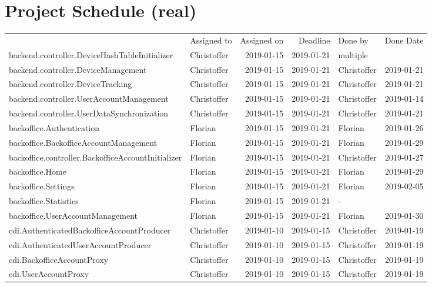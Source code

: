 \chapter{Project Schedule (real)}
\begin{adjustbox}{totalheight=\baselineskip}
\begin{tabular}{ l l r r l r }
 & Assigned to & Assigned on & Deadline & Done by & Done Date \\
backend.controller.DeviceHashTableInitializer & Christoffer & 2019-01-15 & 2019-01-21 & multiple &  \\
backend.controller.DeviceManagement & Christoffer & 2019-01-15 & 2019-01-21 & Christoffer & 2019-01-21 \\
backend.controller.DeviceTracking & Christoffer & 2019-01-15 & 2019-01-21 & Christoffer & 2019-01-21 \\
backend.controller.UserAccountManagement & Christoffer & 2019-01-15 & 2019-01-21 & Christoffer & 2019-01-14 \\
backend.controller.UserDataSynchronization & Christoffer & 2019-01-15 & 2019-01-21 & Christoffer & 2019-01-21 \\
backoffice.Authentication & Florian & 2019-01-15 & 2019-01-21 & Florian & 2019-01-26 \\
backoffice.BackofficeAccountManagement & Florian & 2019-01-15 & 2019-01-21 & Florian & 2019-01-29 \\
backoffice.controller.BackofficeAccountInitializer & Florian & 2019-01-15 & 2019-01-21 & Christoffer & 2019-01-27 \\
backoffice.Home & Florian & 2019-01-15 & 2019-01-21 & Florian & 2019-01-29 \\
backoffice.Settings & Florian & 2019-01-15 & 2019-01-21 & Florian & 2019-02-05 \\
backoffice.Statistics & Florian & 2019-01-15 & 2019-01-21 & - &  \\
backoffice.UserAccountManagement & Florian & 2019-01-15 & 2019-01-21 & Florian & 2019-01-30 \\
cdi.AuthenticatedBackofficeAccountProducer & Christoffer & 2019-01-10 & 2019-01-15 & Christoffer & 2019-01-19 \\
cdi.AuthenticatedUserAccountProducer & Christoffer & 2019-01-10 & 2019-01-15 & Christoffer & 2019-01-19 \\
cdi.BackofficeAccountProxy & Christoffer & 2019-01-10 & 2019-01-15 & Christoffer & 2019-01-19 \\
cdi.UserAccountProxy & Christoffer & 2019-01-10 & 2019-01-15 & Christoffer & 2019-01-19 \\

\end{tabular}
\end{adjustbox}
